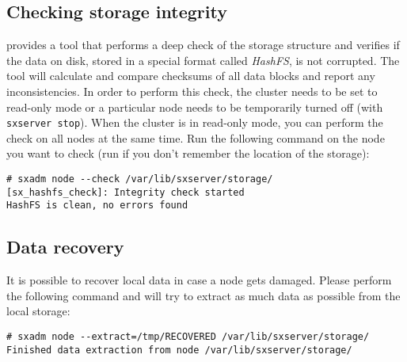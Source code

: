 \subsection{Checking storage integrity}
\SX provides a tool that performs a deep check of the storage structure
and verifies if the data on disk, stored in a special format called \textsl{HashFS},
is not corrupted. The tool will calculate and compare checksums of all
data blocks and report any inconsistencies. In order to perform this check,
the cluster needs to be set to read-only mode or a particular node needs to
be temporarily turned off (with \verb+sxserver stop+). When the cluster is
in read-only mode, you can perform the check on all nodes at the same time.
Run the following command on the node you want to check (run
 if you don't remember the location of the storage):
\begin{lstlisting}
# sxadm node --check /var/lib/sxserver/storage/
[sx_hashfs_check]: Integrity check started   
HashFS is clean, no errors found
\end{lstlisting}

\subsection{Data recovery}
It is possible to recover local data in case a node gets damaged. Please
perform the following command and  will try to extract as
much data as possible from the local storage:
\begin{lstlisting}
# sxadm node --extract=/tmp/RECOVERED /var/lib/sxserver/storage/
Finished data extraction from node /var/lib/sxserver/storage/
\end{lstlisting}
